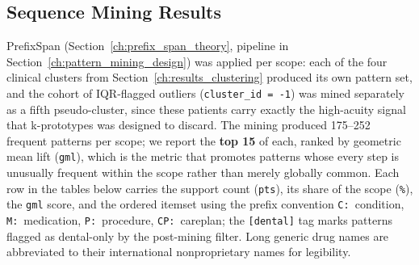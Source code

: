 \subsection{Sequence Mining Results}
\label{ch:results_sequences}

PrefixSpan (Section~\ref{ch:prefix_span_theory}, pipeline in Section~\ref{ch:pattern_mining_design}) was applied per scope: each of the four clinical clusters from Section~\ref{ch:results_clustering} produced its own pattern set, and the cohort of IQR-flagged outliers (\texttt{cluster\_id = -1}) was mined separately as a fifth pseudo-cluster, since these patients carry exactly the high-acuity signal that k-prototypes was designed to discard. The mining produced 175--252 frequent patterns per scope; we report the \textbf{top 15} of each, ranked by geometric mean lift (\texttt{gml}), which is the metric that promotes patterns whose every step is unusually frequent within the scope rather than merely globally common. Each row in the tables below carries the support count (\texttt{pts}), its share of the scope (\texttt{\%}), the \texttt{gml} score, and the ordered itemset using the prefix convention \texttt{C:}~condition, \texttt{M:}~medication, \texttt{P:}~procedure, \texttt{CP:}~careplan; the \texttt{[dental]} tag marks patterns flagged as dental-only by the post-mining filter. Long generic drug names are abbreviated to their international nonproprietary names for legibility.

